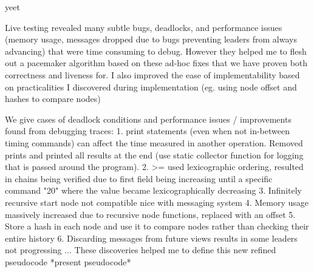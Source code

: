 yeet \cite{yin2019hotstuff}






Live testing revealed many subtle bugs, deadlocks, and performance issues (memory usage, messages dropped due to bugs preventing leaders from always advancing) that were time consuming to debug. However they helped me to flesh out a pacemaker algorithm based on these ad-hoc fixes that we have proven both correctness and liveness for. I also improved the ease of implementability based on practicalities I discovered during implementation (eg. using node offset and hashes to compare nodes)

We give cases of deadlock conditions
and performance issues / improvements found from debugging traces:
1. print statements (even when not in-between timing commands) can affect the time measured in another operation. Removed prints and printed all results at the end (use static collector function for logging that is passed around the program).
2. >= used lexicographic ordering, resulted in chains being verified due to first field being increasing until a specific command "20" where the value became lexicographically decreasing
3. Infinitely recursive start node not compatible nice with messaging system
4. Memory usage massively increased due to recursive node functions, replaced with an offset
5. Store a hash in each node and use it to compare nodes rather than checking their entire history
6. Discarding messages from future views results in some leaders not progressing
...
These discoveries helped me to define this new refined pseudocode
*present pseudocode*